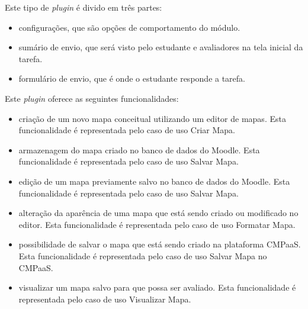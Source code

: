 \documentclass[
	12pt,				%
	openright,			%
	oneside,			%
	a4paper,			%
	english,			%
	french,				%
	spanish,			%
	brazil				%
	]{abntex2}
\begin{document}
Este tipo de \textit{plugin} é divido em três partes:
\begin{itemize}
	\item configurações, que são opções de comportamento do módulo.
	\item sumário de envio, que será visto pelo estudante e avaliadores na tela inicial da tarefa.
	\item formulário de envio, que é onde o estudante responde a tarefa.  
\end{itemize} 

%
Este \textit{plugin} oferece as seguintes funcionalidades:

\begin{itemize}
	\item criação de um novo mapa conceitual utilizando um editor de mapas. Esta funcionalidade é representada pelo caso de uso Criar Mapa.
	\item armazenagem do mapa criado no banco de dados do Moodle. Esta funcionalidade é representada pelo caso de uso Salvar Mapa.
	\item edição de um mapa previamente salvo no banco de dados do Moodle. Esta funcionalidade é representada pelo caso de uso Salvar Mapa.
	\item alteração da aparência de uma mapa que está sendo criado ou modificado no editor. Esta funcionalidade é representada pelo caso de uso Formatar Mapa.  
	\item possibilidade de salvar o mapa que está sendo criado na plataforma CMPaaS. Esta funcionalidade é representada pelo caso de uso Salvar Mapa no CMPaaS.  
	\item visualizar um mapa salvo para que possa ser avaliado. Esta funcionalidade é representada pelo caso de uso Visualizar Mapa.    
\end{itemize} 
\end{document}
